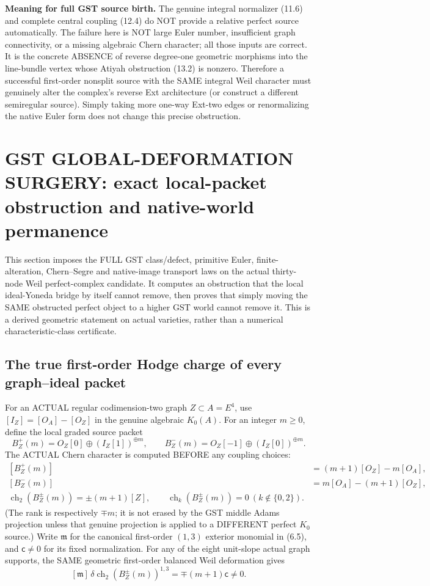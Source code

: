 \documentclass[11pt,a4paper]{article}
\newcommand{\ch}{\operatorname{ch}}
\begin{document}
\noindent\textbf{Meaning for full GST source birth.}
The genuine
integral
normalizer
(11.6)
and complete
central
coupling
(12.4)
do NOT
provide a
relative perfect
source automatically.
The failure
here is NOT
large Euler
number,
insufficient
graph connectivity,
or a
missing algebraic
Chern character;
all those
inputs are
correct.
It is the
concrete
ABSENCE of
reverse
degree-one
geometric
morphisms into
the line-bundle
vertex whose
Atiyah obstruction
(13.2) is
nonzero.
Therefore
a successful
first-order
nonsplit source
with the
SAME integral
Weil character
must genuinely
alter the
complex's
reverse
Ext architecture
(or construct
a different
semiregular
source).
Simply taking
more one-way
Ext-two
edges or
renormalizing
the native
Euler form
does not
change this
precise
obstruction.

\section{GST GLOBAL-DEFORMATION SURGERY: exact local-packet obstruction and native-world permanence}
This section imposes the
FULL GST class/defect,
primitive Euler,
finite-alteration,
Chern--Segre and
native-image transport
laws on the actual
thirty-node Weil
perfect-complex
candidate. It
computes an
obstruction that the
local ideal-Yoneda
bridge by itself
cannot remove, then
proves that simply
moving the SAME
obstructed perfect
object to a higher
GST world
cannot remove it.
This is a derived
geometric
statement on
actual varieties,
rather than a
numerical
characteristic-class
certificate.

\subsection*{The true first-order Hodge charge of every graph--ideal packet}
For an ACTUAL
regular codimension-two
graph \(Z\subset
A=E^4\), use
\(
[I_Z]=[O_A]-[O_Z]
\)
in the genuine
algebraic \(K_0(A)\).
For an integer
\(m\ge0\), define
the local graded
source packet
\[
  B_Z^+(m)=
    O_Z[0]\oplus
              (I_Z[1])^{\oplus m},
 \qquad
  B_Z^-(m)=
    O_Z[-1]\oplus
              (I_Z[0])^{\oplus m}.
\]
The ACTUAL
Chern character
is computed
BEFORE any
coupling choices:
\[
 \begin{aligned}
 [B_Z^+(m)]&=(m+1)[O_Z]-m[O_A],\\
 [B_Z^-(m)]&=m[O_A]-(m+1)[O_Z],\\
 \boxed{\ch_2(B_Z^\pm(m))
      =\pm(m+1)[Z],\qquad
       \ch_k(B_Z^\pm(m))=0\
          (k\notin\{0,2\}).}
 \end{aligned}                                          \tag{14.1}
\]
(The rank is
respectively \(\mp m\);
it is not erased
by the GST
middle Adams projection
unless that genuine
projection is
applied to a
DIFFERENT perfect
\(K_0\) source.)
Write \(\mathfrak m\)
for the canonical
first-order
\((1,3)\) exterior
monomial in (6.5),
and \(\mathsf c\ne0\)
for its fixed
normalization.
For any of the
eight unit-slope
actual graph supports,
the SAME
geometric first-order
balanced Weil
deformation gives
\[
 \boxed{
 [\mathfrak m]\,
 \delta\ch_2(B_Z^\pm(m))^{1,3}
        =\mp(m+1)\mathsf c
        \ne0.}                                          \tag{14.2}
\]
\end{document}
